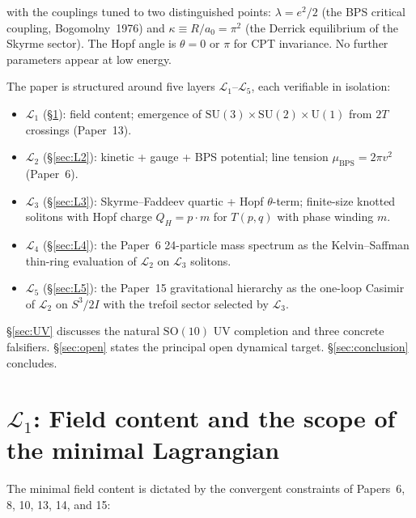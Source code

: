 \documentclass[11pt]{article}
\begin{document}
with the couplings tuned to two distinguished points:
$\lambda = e^2/2$ (the BPS critical coupling, Bogomolny~1976) and
$\kappa \equiv R/a_0 = \pi^2$ (the Derrick equilibrium of the
Skyrme sector).  The Hopf angle is $\theta = 0$ or $\pi$ for CPT
invariance.  No further parameters appear at low energy.

\medskip

The paper is structured around five layers $\mathcal{L}_1$--$\mathcal{L}_5$,
each verifiable in isolation:

\begin{itemize}\setlength\itemsep{1pt}
\item $\mathcal{L}_1$ (\S\ref{sec:L1}): field content; emergence of
$\mathrm{SU}(3) \times \mathrm{SU}(2) \times \mathrm{U}(1)$ from
$2T$ crossings (Paper~13).
\item $\mathcal{L}_2$ (\S\ref{sec:L2}): kinetic + gauge + BPS
potential; line tension $\mu_\text{BPS} = 2\pi v^2$ (Paper~6).
\item $\mathcal{L}_3$ (\S\ref{sec:L3}): Skyrme--Faddeev quartic + Hopf
$\theta$-term; finite-size knotted solitons with Hopf charge
$Q_H = p \cdot m$ for $T(p,q)$ with phase winding $m$.
\item $\mathcal{L}_4$ (\S\ref{sec:L4}): the Paper~6 24-particle mass
spectrum as the Kelvin--Saffman thin-ring evaluation of $\mathcal{L}_2$
on $\mathcal{L}_3$ solitons.
\item $\mathcal{L}_5$ (\S\ref{sec:L5}): the Paper~15 gravitational
hierarchy as the one-loop Casimir of $\mathcal{L}_2$ on $S^3/2I$ with
the trefoil sector selected by $\mathcal{L}_3$.
\end{itemize}

\S\ref{sec:UV} discusses the natural $\mathrm{SO}(10)$ UV completion
and three concrete falsifiers.  \S\ref{sec:open} states the principal
open dynamical target.  \S\ref{sec:conclusion} concludes.

\section{$\mathcal{L}_1$: Field content and the scope of the
minimal Lagrangian}
\label{sec:L1}

The minimal field content is dictated by the convergent constraints
of Papers~6, 8, 10, 13, 14, and 15:
\end{document}
